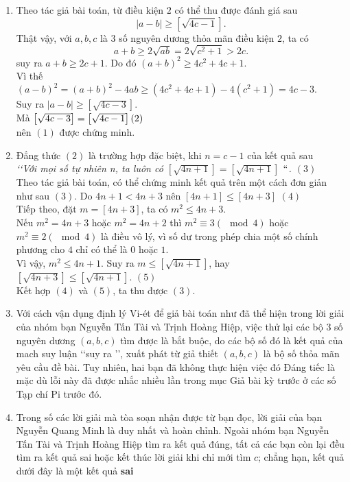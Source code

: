 \begin{bt}
{\begin{enumerate}
	\item Theo tác giả bài toán, từ điều kiện $2$ có thể thu được đánh giá sau
	\[|a-b| \geq \left[ \sqrt{4c-1}\right].\tag{1}\]
	Thật vậy, với $a,b,c$ là $3$ số nguyên dương thỏa mãn điều kiện $2$, ta có
	$$a+b \geq 2\sqrt{ab}=2\sqrt{c^2+1}>2c.$$
	suy ra $a+b \geq 2c+1$. Do đó $(a+b)^2 \geq 4c^2+4c+1$.\\
	Vì thế $(a-b)^2=(a+b)^2-4ab \geq (4c^2+4c+1)-4(c^2+1)=4c-3.$\\
	Suy ra $|a-b| \geq \left[\sqrt{4c-3} \right].$\\
	Mà $\left[ \sqrt{4c-3}\right]=\left[ \sqrt{4c-1}\right] \hfill (2)$\\
	nên $(1)$ được chứng minh.
	\item Đẳng thức $(2)$ là trường hợp đặc biệt, khi $n=c-1$ của kết quả sau\\
	\textit{\lq \lq Với mọi số tự nhiên n, ta luôn có $\left[\sqrt{4n+1} \right]=\left[\sqrt{4n+1}\right]$ $\lq \lq$. \hfill $(3)$}\\
	Theo tác giả bài toán, có thể chứng minh kết quả trên một cách đơn  giản như sau
	\cm $(3)$. Do $4n+1<4n+3$ nên $\left[4n+1 \right] \leq  \left[ 4n+3 \right]$ \hfill $(4)$\\
	Tiếp theo, đặt $m=\left[ 4n+3 \right]$, ta có $m^2 \leq 4n+3$.\\
	Nếu $m^2=4n+3$ hoặc $m^2=4n+2$ thì $m^2\equiv 3(\mod 4)$ hoặc $m^2 \equiv 2(\mod 4)$ là điều vô lý, vì số dư trong phép chia một số chính phương cho $4$ chỉ có thể là $0$ hoặc $1$.\\
	Vì vậy, $m^2 \leq 4n+1$. Suy ra $m \leq \left[ \sqrt{4n+1} \right]$, hay $\left[ \sqrt{4n+3} \right] \leq \left[ \sqrt{4n+1} \right].$ \hfill $(5)$\\
	Kết hợp $(4)$ và $(5)$, ta thu được $(3)$.
	\item Với cách vận dụng định lý Vi-ét để giả bài toán như đã thể hiện trong lời giải của nhóm bạn Nguyễn Tấn Tài và Trịnh Hoàng Hiệp, việc thử lại các bộ $3$ số nguyên dương $(a,b,c)$ tìm được là bắt buộc, do các bộ số đó là kết quả của mach suy luận \lq \lq suy ra \rq \rq, xuất phát từ giả thiết $(a,b,c)$ là bộ số thỏa mãn yêu cầu đề bài. Tuy nhiên, hai bạn đã không thực hiện việc đó Đáng tiếc là mặc dù lỗi này đã được nhắc nhiều lần trong mục Giả bài kỳ trước ở các số Tạp chí Pi trước đó.
	\item Trong số các lời giải mà tòa soạn nhận được từ bạn đọc, lời giải của bạn Nguyễn Quang Minh là duy nhất và hoàn chỉnh. Ngoài nhóm bạn Nguyễn Tấn Tài và Trịnh Hoàng Hiệp tìm ra kết quả đúng, tất cả các bạn còn lại đều tìm ra kết quả sai hoặc kết thúc lời giải khi chỉ mới tìm $c$; chẳng hạn, kết quả dưới đây là một kết quả \textbf{sai}

\end{enumerate}}
\end{bt}
